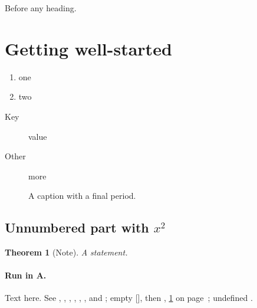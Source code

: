 \documentclass{article}
\newtheorem{theorem}{Theorem}
\begin{document}
Before any heading\label{none}.
\section{Getting well-started}\label{s1}
\begin{enumerate}\item one\label{i1} \item two\end{enumerate}
\begin{description}\item[Key] value\label{d1} \item[Other] more\end{description}
\begin{figure}[h]\centering\caption{A caption with a final period.}\label{f1}\end{figure}
\subsection*{Unnumbered part with $x^2$}\label{s2}
\begin{theorem}[Note]\label{t1}
A statement.
\end{theorem}
\paragraph{Run in A.} Text\label{p1} here.
See , , , , , ,  and
; empty [], then , \ref{s1} on page~\pageref{s1}; undefined .
\end{document}
